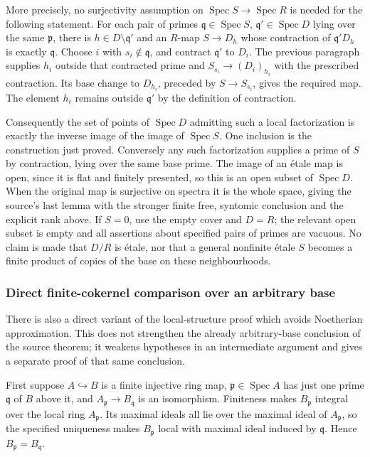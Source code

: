 More precisely, no surjectivity assumption on \(\operatorname{Spec}S\to\operatorname{Spec}R\) is needed for the following statement. For each pair of primes \(\mathfrak q\in\operatorname{Spec}S\), \(\mathfrak q'\in\operatorname{Spec}D\) lying over the same \(\mathfrak p\), there is \(h\in D\setminus\mathfrak q'\) and an \(R\)-map \(S\to D_h\) whose contraction of \(\mathfrak q'D_h\) is exactly \(\mathfrak q\). Choose \(i\) with \(s_i\notin\mathfrak q\), and contract \(\mathfrak q'\) to \(D_i\). The previous paragraph supplies \(h_i\) outside that contracted prime and \(S_{s_i}\to(D_i)_{h_i}\) with the prescribed contraction. Its base change to \(D_{h_i}\), preceded by \(S\to S_{s_i}\), gives the required map. The element \(h_i\) remains outside \(\mathfrak q'\) by the definition of contraction.

Consequently the set of points of \(\operatorname{Spec}D\) admitting such a local factorization is exactly the inverse image of the image of \(\operatorname{Spec}S\). One inclusion is the construction just proved. Conversely any such factorization supplies a prime of \(S\) by contraction, lying over the same base prime. The image of an étale map is open, since it is flat and finitely presented, so this is an open subset of \(\operatorname{Spec}D\). When the original map is surjective on spectra it is the whole space, giving the source's last lemma with the stronger finite free, syntomic conclusion and the explicit rank above. If \(S=0\), use the empty cover and \(D=R\); the relevant open subset is empty and all assertions about specified pairs of primes are vacuous. No claim is made that \(D/R\) is étale, nor that a general nonfinite étale \(S\) becomes a finite product of copies of the base on these neighbourhoods.

\subsubsection{Direct finite-cokernel comparison over an arbitrary base}\label{algebra-proof-052-direct-finite-cokernel-comparison-over-an-arbitrary-base}

There is also a direct variant of the local-structure proof which avoids Noetherian approximation. This does not strengthen the already arbitrary-base conclusion of the source theorem; it weakens hypotheses in an intermediate argument and gives a separate proof of that same conclusion.

First suppose \(A\hookrightarrow B\) is a finite injective ring map, \(\mathfrak p\in\operatorname{Spec}A\) has just one prime \(\mathfrak q\) of \(B\) above it, and \(A_{\mathfrak p}\to B_{\mathfrak q}\) is an isomorphism. Finiteness makes \(B_{\mathfrak p}\) integral over the local ring \(A_{\mathfrak p}\). Its maximal ideals all lie over the maximal ideal of \(A_{\mathfrak p}\), so the specified uniqueness makes \(B_{\mathfrak p}\) local with maximal ideal induced by \(\mathfrak q\). Hence \(B_{\mathfrak p}=B_{\mathfrak q}\).


